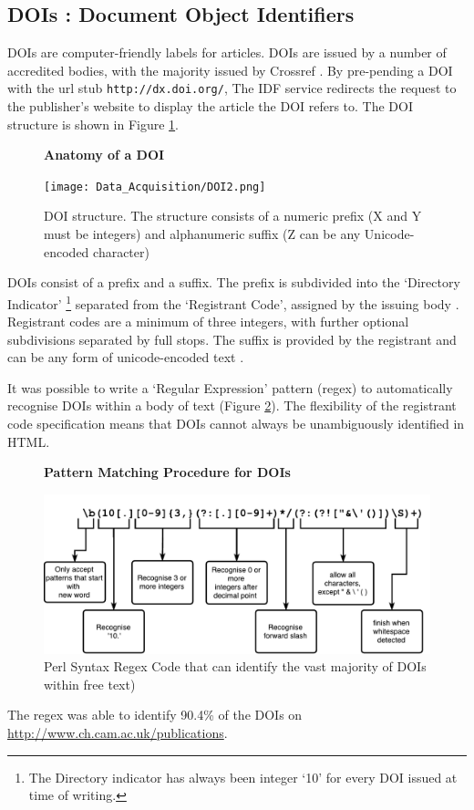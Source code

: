 \subsection{DOIs : Document Object Identifiers}
\label{sec:DOI}
DOIs are computer-friendly labels for articles. DOIs are issued by a number of accredited bodies, with the majority issued by Crossref \cite{crossref-formation}. By pre-pending a DOI with the url stub \texttt{http://dx.doi.org/}, The IDF service redirects the request to the publisher's website to display the article the DOI refers to. The DOI structure is shown in Figure \ref{fig:DOI}.
\begin{figure}[H]
    \centering
    \textbf{Anatomy of a DOI}\par\medskip
    \texttt{[image: Data\_Acquisition/DOI2.png]}
    \caption[Anatomy of a DOI]{DOI structure. The structure consists of a numeric prefix (X and Y must be integers) and alphanumeric suffix (Z can be any Unicode-encoded character)} \label{fig:DOI}
\end{figure}
DOIs consist of a prefix and a suffix. The prefix is subdivided into the ‘Directory Indicator’ \footnote{The Directory indicator has always been integer ‘10’ for every DOI issued at time of writing.} separated from the ‘Registrant Code’, assigned by the issuing body \cite{doi_handbook1}. Registrant codes are a minimum of three integers, with further optional subdivisions separated by full stops. The suffix is provided by the registrant and can be any form of unicode-encoded text \cite{doi_handbook1}.

It was possible to write a `Regular Expression' pattern (regex) to automatically recognise DOIs within a body of text (Figure \ref{fig:REGEX}). The flexibility of the registrant code specification means that DOIs cannot always be unambiguously identified in HTML. 
\begin{figure}[H]
    \centering
    \textbf{Pattern Matching Procedure for DOIs}\par\medskip
    \includegraphics[width=\textwidth]{Data_Acquisition/Regex.pdf}
    \caption[Pattern Matching Procdure for DOIs]{Perl Syntax Regex Code that can identify the vast majority of DOIs within free text)} \label{fig:REGEX}
\end{figure}
The regex was able to identify 90.4\% of the DOIs on \url{http://www.ch.cam.ac.uk/publications}. 
